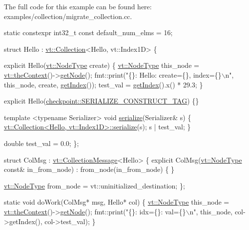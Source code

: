 The full code for this example can be found here\+: {\ttfamily examples/collection/migrate\+\_\+collection.\+cc}.


\begin{DoxyCodeInclude}
\textcolor{keyword}{static} constexpr int32\_t \textcolor{keyword}{const} default\_num\_elms = 16;

\textcolor{keyword}{struct }Hello : \hyperlink{structvt_1_1vrt_1_1collection_1_1_collection}{vt::Collection}<Hello, vt::Index1D> \{

  \textcolor{keyword}{explicit} Hello(\hyperlink{namespacevt_a866da9d0efc19c0a1ce79e9e492f47e2}{vt::NodeType} create) \{
    \hyperlink{namespacevt_a866da9d0efc19c0a1ce79e9e492f47e2}{vt::NodeType} this\_node = \hyperlink{namespacevt_a26551fe0e6e6a1371111df5b12c7e92c}{vt::theContext}()->\hyperlink{structvt_1_1ctx_1_1_context_a0d52c263ce8516546a67443d9a86fa5f}{getNode}();
    fmt::print(\textcolor{stringliteral}{"\{\}: Hello: create=\{\}, index=\{\}\(\backslash\)n"}, this\_node, create, \hyperlink{structvt_1_1vrt_1_1collection_1_1_indexable_a28d05f23e7a20e12e94b8235305c1e82}{getIndex}());
    test\_val = \hyperlink{structvt_1_1vrt_1_1collection_1_1_indexable_a28d05f23e7a20e12e94b8235305c1e82}{getIndex}().x() * 29.3;
  \}

  \textcolor{keyword}{explicit} Hello(\hyperlink{structcheckpoint_1_1dispatch_1_1_s_e_r_i_a_l_i_z_e___c_o_n_s_t_r_u_c_t___t_a_g}{checkpoint::SERIALIZE\_CONSTRUCT\_TAG}) \{\}

  \textcolor{keyword}{template} <\textcolor{keyword}{typename} Serializer>
  \textcolor{keywordtype}{void} \hyperlink{structvt_1_1vrt_1_1collection_1_1_collection_base_a8f5dc077e523958ea8b7290b8a10846f}{serialize}(Serializer& s) \{
    \hyperlink{structvt_1_1vrt_1_1collection_1_1_collection_base_a8f5dc077e523958ea8b7290b8a10846f}{vt::Collection<Hello, vt::Index1D>::serialize}(s);
    s | test\_val;
  \}

  \textcolor{keywordtype}{double} test\_val = 0.0;
\};

\textcolor{keyword}{struct }ColMsg : \hyperlink{structvt_1_1vrt_1_1collection_1_1_collection_message}{vt::CollectionMessage}<Hello> \{
  \textcolor{keyword}{explicit} ColMsg(\hyperlink{namespacevt_a866da9d0efc19c0a1ce79e9e492f47e2}{vt::NodeType} \textcolor{keyword}{const}& in\_from\_node)
    : from\_node(in\_from\_node)
  \{ \}

  \hyperlink{namespacevt_a866da9d0efc19c0a1ce79e9e492f47e2}{vt::NodeType} from\_node = vt::uninitialized\_destination;
\};

\textcolor{keyword}{static} \textcolor{keywordtype}{void} doWork(ColMsg* msg, Hello* col) \{
  \hyperlink{namespacevt_a866da9d0efc19c0a1ce79e9e492f47e2}{vt::NodeType} this\_node = \hyperlink{namespacevt_a26551fe0e6e6a1371111df5b12c7e92c}{vt::theContext}()->\hyperlink{structvt_1_1ctx_1_1_context_a0d52c263ce8516546a67443d9a86fa5f}{getNode}();
  fmt::print(\textcolor{stringliteral}{"\{\}: idx=\{\}: val=\{\}\(\backslash\)n"}, this\_node, col->getIndex(), col->test\_val);
\}


\end{DoxyCodeInclude}
